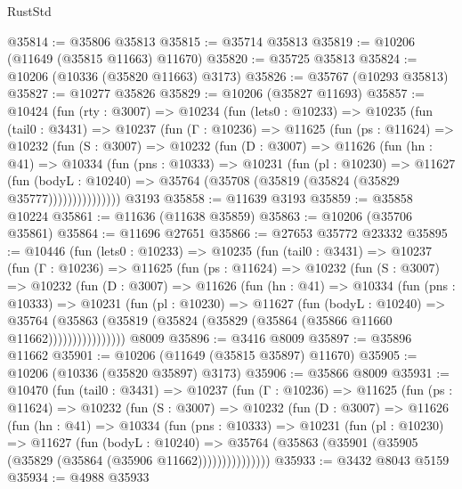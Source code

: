 \begin{lexlean}{RustStd}
\begin{coremodule}
@35814 := @35806 @35813
@35815 := @35714 @35813
@35819 := @10206 (@11649 (@35815 @11663) @11670)
@35820 := @35725 @35813
@35824 := @10206 (@10336 (@35820 @11663) @3173)
@35826 := @35767 (@10293 @35813)
@35827 := @10277 @35826
@35829 := @10206 (@35827 @11693)
@35857 := @10424
    (fun (rty : @3007) =>
    @10234
      (fun (lets0 : @10233) =>
      @10235
        (fun (tail0 : @3431) =>
        @10237
          (fun (Γ : @10236) =>
          @11625
            (fun (ps : @11624) =>
            @10232
              (fun (S : @3007) =>
              @10232
                (fun (D : @3007) =>
                @11626
                  (fun (hn : @41) =>
                  @10334
                    (fun (pns : @10333) =>
                    @10231
                      (fun (pl : @10230) =>
                      @11627
                        (fun (bodyL : @10240) =>
                        @35764 (@35708 (@35819 (@35824 (@35829 @35777)))))))))))))))
    @3193
@35858 := @11639 @3193
@35859 := @35858 @10224
@35861 := @11636 (@11638 @35859)
@35863 := @10206 (@35706 @35861)
@35864 := @11696 @27651
@35866 := @27653 @35772 @23332
@35895 := @10446
    (fun (lets0 : @10233) =>
    @10235
      (fun (tail0 : @3431) =>
      @10237
        (fun (Γ : @10236) =>
        @11625
          (fun (ps : @11624) =>
          @10232
            (fun (S : @3007) =>
            @10232
              (fun (D : @3007) =>
              @11626
                (fun (hn : @41) =>
                @10334
                  (fun (pns : @10333) =>
                  @10231
                    (fun (pl : @10230) =>
                    @11627
                      (fun (bodyL : @10240) =>
                      @35764
                        (@35863
                          (@35819 (@35824 (@35829 (@35864 (@35866 @11660 @11662))))))))))))))))
    @8009
@35896 := @3416 @8009
@35897 := @35896 @11662
@35901 := @10206 (@11649 (@35815 @35897) @11670)
@35905 := @10206 (@10336 (@35820 @35897) @3173)
@35906 := @35866 @8009
@35931 := @10470
    (fun (tail0 : @3431) =>
    @10237
      (fun (Γ : @10236) =>
      @11625
        (fun (ps : @11624) =>
        @10232
          (fun (S : @3007) =>
          @10232
            (fun (D : @3007) =>
            @11626
              (fun (hn : @41) =>
              @10334
                (fun (pns : @10333) =>
                @10231
                  (fun (pl : @10230) =>
                  @11627
                    (fun (bodyL : @10240) =>
                    @35764 (@35863 (@35901 (@35905 (@35829 (@35864 (@35906 @11662)))))))))))))))
@35933 := @3432 @8043 @5159
@35934 := @4988 @35933

\end{coremodule}
\end{lexlean}
